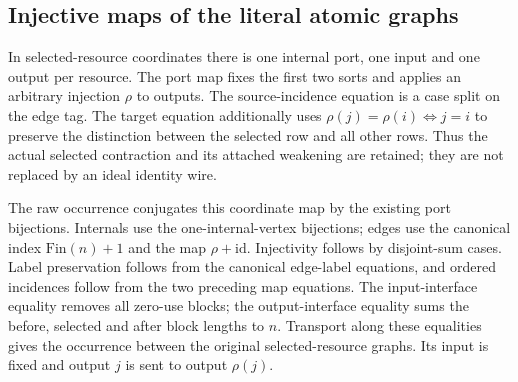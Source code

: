 


\subsection{Injective maps of the literal atomic graphs}

In selected-resource coordinates there is one internal port, one input and
one output per resource. The port map fixes the first two sorts and applies
an arbitrary injection $\rho$ to outputs. The source-incidence equation is a
case split on the edge tag. The target equation additionally uses
$\rho(j)=\rho(i)\iff j=i$ to preserve the distinction between the selected row
and all other rows. Thus the actual selected contraction and its attached
weakening are retained; they are not replaced by an ideal identity wire.




The raw occurrence conjugates this coordinate map by the existing port
bijections. Internals use the one-internal-vertex bijections; edges use the
canonical index $\mathrm{Fin}(n)+1$ and the map $\rho+\mathrm{id}$. Injectivity
follows by disjoint-sum cases. Label preservation follows from the canonical
edge-label equations, and ordered incidences follow from the two preceding
map equations. The input-interface equality removes all zero-use blocks;
the output-interface equality sums the before, selected and after block
lengths to $n$. Transport along these equalities gives the occurrence between
the original selected-resource graphs. Its input is fixed and output $j$
is sent to output $\rho(j)$.




